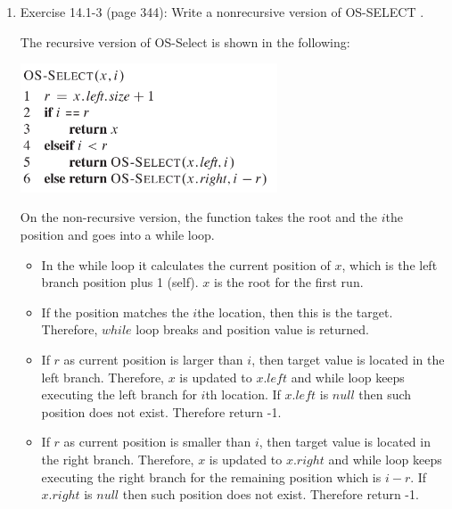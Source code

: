 \documentclass[11pt]{article}
\begin{document}
\begin{enumerate}

\itemsep 0.35in



\item Exercise 14.1-3 (page 344): Write a nonrecursive version of OS-SELECT .

	The recursive version of OS-Select is shown in the following:
		
	{\includegraphics[width=3in]{OS-Select.png}}
	
	On the non-recursive version, the function takes the root and the $i$the position and goes into a while loop.
	
	\begin{itemize}
     	\item In the while loop it calculates the current position of $x$, which is the left branch position plus 1 (self). $x$ is the root for the first run.  
     	
     	\item If the position matches the $i$the location, then this is the target. Therefore, $while$ loop breaks and position value is returned.
     
     	\item If $r$ as current position is larger than $i$, then target value is located in the left branch. Therefore, $x$ is updated to $x.left$ and while loop keeps executing the left branch for $i$th location. If $x.left$ is $null$ then such position does not exist. Therefore return -1. 
     	
     	\item If $r$ as current position is smaller than $i$, then target value is located in the right branch. Therefore, $x$ is updated to $x.right$ and while loop keeps executing the right branch for the remaining position which is $i-r$. If $x.right$ is $null$ then such position does not exist. Therefore return -1.
     	
     \end{itemize}
	
	
	 	
	
	\begin{codebox}
		

\end{codebox}
\end{enumerate}
\end{document}
